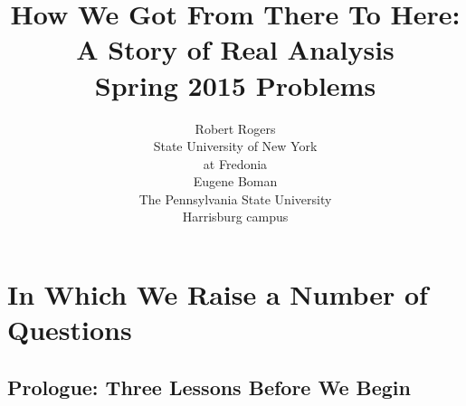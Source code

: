 \documentclass[oneside]{book}
\begin{document}
\title{{\sc How We Got From There To Here:\\} A Story of Real
  Analysis\\ Spring 2015 Problems }
\author{Robert Rogers \\State University of New York \\at
  Fredonia\\[5mm]Eugene Boman \\The Pennsylvania State University \\Harrisburg campus}
\date{}
\maketitle
\newpage{}
\tableofcontents{}

\part{In Which We Raise a Number of Questions}
\chapter*{Prologue: Three Lessons Before We Begin}
\label{sec:two-lessons-before}


\pagestyle{myheadings}
\end{document}
